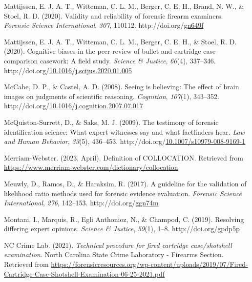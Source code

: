 \documentclass[print]{nuthesis}
\newlength{\cslhangindent}
\newenvironment{CSLReferences}[2]%
{\setlength{\parindent}{0pt}%
\everypar{\setlength{\hangindent}{\cslhangindent}}\ignorespaces}%
{\par}
\begin{document}
\begin{CSLReferences}{1}{0}
\leavevmode{}%
Mattijssen, E. J. A. T., Witteman, C. L. M., Berger, C. E. H., Brand, N. W., \& Stoel, R. D. (2020). Validity and reliability of forensic firearm examiners. \emph{Forensic Science International}, \emph{307}, 110112. http://doi.org/\href{https://doi.org/gn649f}{gn649f}

\leavevmode{}%
Mattijssen, E. J. A. T., Witteman, C. L. M., Berger, C. E. H., \& Stoel, R. D. (2020). Cognitive biases in the peer review of bullet and cartridge case comparison casework: {A} field study. \emph{Science \& Justice}, \emph{60}(4), 337--346. http://doi.org/\href{https://doi.org/10.1016/j.scijus.2020.01.005}{10.1016/j.scijus.2020.01.005}

\leavevmode{}%
McCabe, D. P., \& Castel, A. D. (2008). Seeing is believing: {The} effect of brain images on judgments of scientific reasoning. \emph{Cognition}, \emph{107}(1), 343--352. http://doi.org/\href{https://doi.org/10.1016/j.cognition.2007.07.017}{10.1016/j.cognition.2007.07.017}

\leavevmode{}%
McQuiston-Surrett, D., \& Saks, M. J. (2009). The testimony of forensic identification science: {What} expert witnesses say and what factfinders hear. \emph{Law and Human Behavior}, \emph{33}(5), 436--453. http://doi.org/\href{https://doi.org/10.1007/s10979-008-9169-1}{10.1007/s10979-008-9169-1}

\leavevmode{}%
Merriam-Webster. (2023, April). Definition of {COLLOCATION}. Retrieved from \url{https://www.merriam-webster.com/dictionary/collocation}

\leavevmode{}%
Meuwly, D., Ramos, D., \& Haraksim, R. (2017). A guideline for the validation of likelihood ratio methods used for forensic evidence evaluation. \emph{Forensic Science International}, \emph{276}, 142--153. http://doi.org/\href{https://doi.org/ggn74m}{ggn74m}

\leavevmode{}%
Montani, I., Marquis, R., Egli Anthonioz, N., \& Champod, C. (2019). Resolving differing expert opinions. \emph{Science \& Justice}, \emph{59}(1), 1--8. http://doi.org/\href{https://doi.org/gpdp5p}{gpdp5p}

\leavevmode{}%
NC Crime Lab. (2021). \emph{Technical procedure for fired cartridge case/shotshell examination}. North Carolina State Crime Laboratory - Firearms Section. Retrieved from \url{https://forensicresources.org/wp-content/uploads/2019/07/Fired-Cartridge-Case-Shotshell-Examination-06-25-2021.pdf}


\end{CSLReferences}
\end{document}
